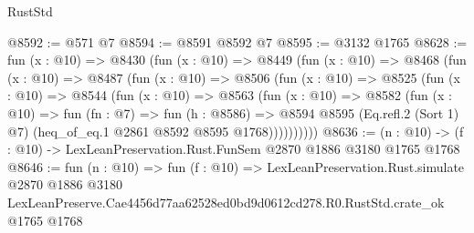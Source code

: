 \begin{lexlean}{RustStd}
\begin{coremodule}
@8592 := @571 @7
@8594 := @8591 @8592 @7
@8595 := @3132 @1765
@8628 := fun (x : @10) =>
  @8430
    (fun (x : @10) =>
    @8449
      (fun (x : @10) =>
      @8468
        (fun (x : @10) =>
        @8487
          (fun (x : @10) =>
          @8506
            (fun (x : @10) =>
            @8525
              (fun (x : @10) =>
              @8544
                (fun (x : @10) =>
                @8563
                  (fun (x : @10) =>
                  @8582
                    (fun (x : @10) =>
                    fun (fn : @7) =>
                    fun (h : @8586) =>
                    @8594
                      @8595
                      (Eq.refl.{2} (Sort 1) @7)
                      (heq_of_eq.{1} @2861 @8592 @8595 @1768))))))))))
@8636 := (n : @10) -> (f : @10) -> LexLeanPreservation.Rust.FunSem @2870 @1886 @3180 @1765 @1768
@8646 := fun (n : @10) =>
  fun (f : @10) =>
  LexLeanPreservation.Rust.simulate
    @2870
    @1886
    @3180
    LexLeanPreserve.Cae4456d77aa62528ed0bd9d0612cd278.R0.RustStd.crate_ok
    @1765
    @1768
\end{coremodule}
\end{lexlean}
